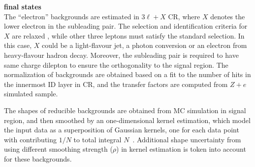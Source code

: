 \textbf{\llee final states} \\
The ``electron'' backgrounds are estimated in $3\ell+X$ CR, where $X$ denotes the lower \pt electron in the subleading pair.
The selection and identification criteria for $X$ are relaxed , while other three leptons must satisfy the standard selection.
In this case, $X$ could be a light-flavour jet, a photon conversion or an electron from heavy-flavour hadron decay.
Moreover, the subleading pair is required to have same charge dilepton to ensure the orthogonality to the signal region.
The normalization of backgrounds are obtained based on a fit to the number of hits in the innermost ID layer in CR,
and the transfer factors are computed from $Z+e$ simulated sample.

The \mfl shapes of reducible backgrounds are obtained from MC simulation in signal region, and then smoothed by an one-dimensional kernel estimation,
which model the input data as a superposition of Gaussian kernels, one for each data point with contributing $1/N$ to total integral $N$~\cite{Cranmer:2000du}.
Additional shape uncertainty from using different smoothing strength ($\rho$) in kernel estimation is token into account for these backgrounds.

